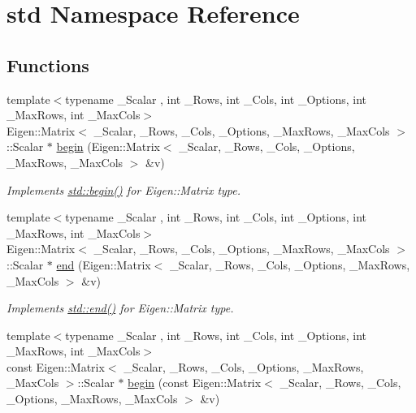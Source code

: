 \hypertarget{namespacestd}{}\section{std Namespace Reference}
\label{namespacestd}
\subsection*{Functions}
\begin{DoxyCompactItemize}
\item 
{\footnotesize template$<$typename \+\_\+\+Scalar , int \+\_\+\+Rows, int \+\_\+\+Cols, int \+\_\+\+Options, int \+\_\+\+Max\+Rows, int \+\_\+\+Max\+Cols$>$ }\\Eigen\+::\+Matrix$<$ \+\_\+\+Scalar, \+\_\+\+Rows, \+\_\+\+Cols, \+\_\+\+Options, \+\_\+\+Max\+Rows, \+\_\+\+Max\+Cols $>$\+::Scalar $\ast$ \hyperlink{namespacestd_acec9a198880c12f51f02be95a298a48b}{begin} (Eigen\+::\+Matrix$<$ \+\_\+\+Scalar, \+\_\+\+Rows, \+\_\+\+Cols, \+\_\+\+Options, \+\_\+\+Max\+Rows, \+\_\+\+Max\+Cols $>$ \&v)
\begin{DoxyCompactList}\small\item\em Implements \hyperlink{namespacestd_acec9a198880c12f51f02be95a298a48b}{std\+::begin()} for Eigen\+::\+Matrix type. \end{DoxyCompactList}\item 
{\footnotesize template$<$typename \+\_\+\+Scalar , int \+\_\+\+Rows, int \+\_\+\+Cols, int \+\_\+\+Options, int \+\_\+\+Max\+Rows, int \+\_\+\+Max\+Cols$>$ }\\Eigen\+::\+Matrix$<$ \+\_\+\+Scalar, \+\_\+\+Rows, \+\_\+\+Cols, \+\_\+\+Options, \+\_\+\+Max\+Rows, \+\_\+\+Max\+Cols $>$\+::Scalar $\ast$ \hyperlink{namespacestd_aeb4b319cf9afda99ba1f47d32df15bc9}{end} (Eigen\+::\+Matrix$<$ \+\_\+\+Scalar, \+\_\+\+Rows, \+\_\+\+Cols, \+\_\+\+Options, \+\_\+\+Max\+Rows, \+\_\+\+Max\+Cols $>$ \&v)
\begin{DoxyCompactList}\small\item\em Implements \hyperlink{namespacestd_aeb4b319cf9afda99ba1f47d32df15bc9}{std\+::end()} for Eigen\+::\+Matrix type. \end{DoxyCompactList}\item 
{\footnotesize template$<$typename \+\_\+\+Scalar , int \+\_\+\+Rows, int \+\_\+\+Cols, int \+\_\+\+Options, int \+\_\+\+Max\+Rows, int \+\_\+\+Max\+Cols$>$ }\\const Eigen\+::\+Matrix$<$ \+\_\+\+Scalar, \+\_\+\+Rows, \+\_\+\+Cols, \+\_\+\+Options, \+\_\+\+Max\+Rows, \+\_\+\+Max\+Cols $>$\+::Scalar $\ast$ \hyperlink{namespacestd_a5dbbf4f3aa392edddc233eaba37e4b73}{begin} (const Eigen\+::\+Matrix$<$ \+\_\+\+Scalar, \+\_\+\+Rows, \+\_\+\+Cols, \+\_\+\+Options, \+\_\+\+Max\+Rows, \+\_\+\+Max\+Cols $>$ \&v)

\end{DoxyCompactItemize}
